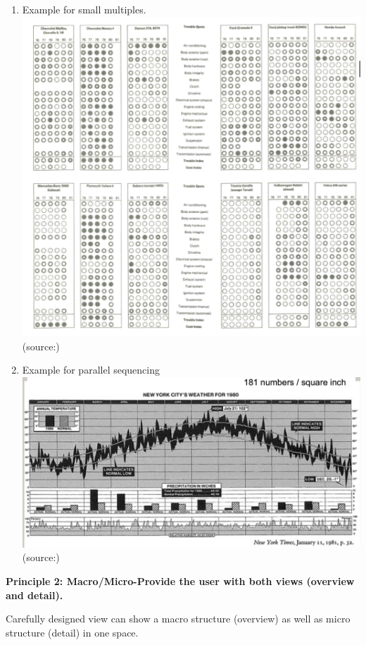 \documentclass[]{book}
\theoremstyle{definition}
\theoremstyle{definition}
\theoremstyle{definition}
\theoremstyle{remark}
\begin{document}
\begin{enumerate}
\def\labelenumi{\arabic{enumi}.}
\item
  Example for small multiples.\\
  \includegraphics{images/Tufte_figure8.png} (source:\citep{Tufte_2001})
\item
  Example for parallel sequencing\\
  \includegraphics{images/Tufte_figure7.png} (source:\citep{Tufte_2001})
\end{enumerate}

\textbf{Principle 2: Macro/Micro-Provide the user with both views
(overview and detail).}

Carefully designed view can show a macro structure (overview) as well as
micro structure (detail) in one space.
\end{document}
